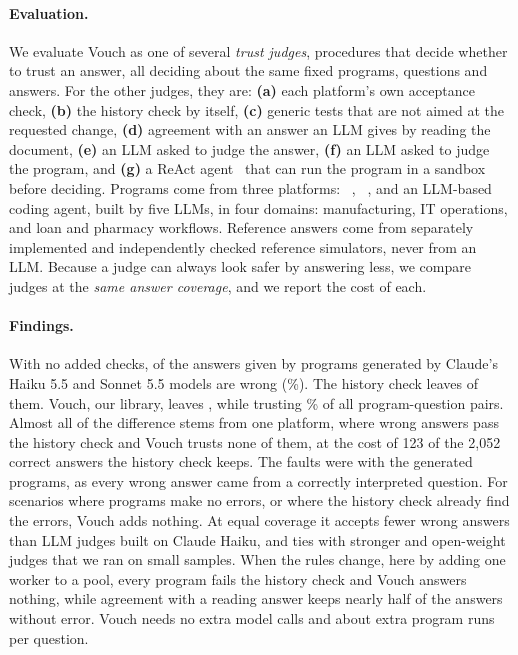 \paragraph{Evaluation.} We evaluate Vouch as one of several \emph{trust judges}, procedures that decide whether to trust an answer, all deciding about the same fixed programs, questions and answers. For the other judges, they are: \textbf{(a)} each platform's own acceptance check, \textbf{(b)} the history check by itself, \textbf{(c)} generic tests that are not aimed at the requested change, \textbf{(d)} agreement with an answer an LLM gives by reading the document, \textbf{(e)} an LLM asked to judge the answer, \textbf{(f)} an LLM asked to judge the program, and \textbf{(g)} a ReAct agent~\cite{yao2023react} that can run the program in a sandbox before deciding. Programs come from three platforms: \otf~\cite{otftools2026}, \devs~\cite{chen2026devs}, and an LLM-based coding agent, built by five LLMs, in four domains: manufacturing, IT operations, and loan and pharmacy workflows. Reference answers come from separately implemented and independently checked reference simulators, never from an LLM. Because a judge can always look safer by answering less, we compare judges at the \emph{same answer coverage}, and we report the cost of each.

\paragraph{Findings.} With no added checks, \rNoCheckWrongClaude{} of the answers given by programs generated by Claude's Haiku 5.5 and Sonnet 5.5 models are wrong (\rNoCheckErrClaude\%). The history check leaves \rHistWrongClaude{} of them. Vouch, our library, leaves \rGateWrongClaude{}, while trusting \rGateCovClaude\% of all program-question pairs. Almost all of the difference stems from one platform, where \rOtfHistWrong{} wrong answers pass the history check and Vouch trusts none of them, at the cost of 123 of the 2{,}052 correct answers the history check keeps. The faults were with the generated programs, as every wrong answer came from a correctly interpreted question. For scenarios where programs make no errors, or where the history check already find the errors, Vouch adds nothing. At equal coverage it accepts fewer wrong answers than LLM judges built on Claude Haiku, and ties with stronger and open-weight judges that we ran on small samples. When the rules change, here by adding one worker to a pool, every program fails the history check and Vouch answers nothing, while agreement with a reading answer keeps nearly half of the answers without error. Vouch needs no extra model calls and about \rGateExecPerQ{} extra program runs per question.

